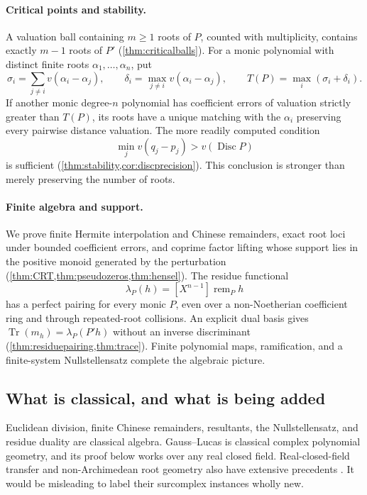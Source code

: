 \documentclass[11pt,letterpaper]{article}
\numberwithin{equation}{section}
\theoremstyle{definition}
\theoremstyle{remark}
\newcommand{\Disc}{\operatorname{Disc}}
\newcommand{\Tr}{\operatorname{Tr}}
\newcommand{\remp}{\operatorname{rem}}
\begin{document}
\paragraph{Critical points and stability.}
A valuation ball containing $m\ge1$ roots of $P$, counted with multiplicity,
contains exactly $m-1$ roots of $P'$ (\cref{thm:criticalballs}). For a
monic polynomial with distinct finite roots $\alpha_1,\ldots,\alpha_n$, put
\begin{equation}\label{eq:introthreshold}
 \sigma_i=\sum_{j\ne i}v(\alpha_i-\alpha_j),\qquad
 \delta_i=\max_{j\ne i}v(\alpha_i-\alpha_j),\qquad
 T(P)=\max_i(\sigma_i+\delta_i).
\end{equation}
If another monic degree-$n$ polynomial has coefficient errors of valuation
strictly greater than $T(P)$, its roots have a unique matching with the
$\alpha_i$ preserving every pairwise distance valuation. The more readily
computed condition
\[
 \min_jv(q_j-p_j)>v(\Disc P)
\]
is sufficient (\cref{thm:stability,cor:discprecision}). This conclusion is
stronger than merely preserving the number of roots.

\paragraph{Finite algebra and support.}
We prove finite Hermite interpolation and Chinese remainders, exact root
loci under bounded coefficient errors, and coprime factor lifting whose
support lies in the positive monoid generated by the perturbation
(\cref{thm:CRT,thm:pseudozeros,thm:hensel}). The residue functional
\[
 \lambda_P(h)=[X^{n-1}]\remp_P h
\]
has a perfect pairing for every monic $P$, even over a non-Noetherian
coefficient ring and through repeated-root collisions. An explicit dual
basis gives $\Tr(m_h)=\lambda_P(P'h)$ without an inverse discriminant
(\cref{thm:residuepairing,thm:trace}). Finite polynomial maps, ramification,
and a finite-system Nullstellensatz complete the algebraic picture.

\subsection{What is classical, and what is being added}
Euclidean division, finite Chinese remainders, resultants, the
Nullstellensatz, and residue duality are classical algebra. Gauss--Lucas is
classical complex polynomial geometry, and its proof below works over any
real closed field. Real-closed-field transfer and non-Archimedean root
geometry also have extensive precedents \cite{CohenMahboubi,Eisermann,Faber}.
It would be misleading to label their surcomplex instances wholly new.
\end{document}
